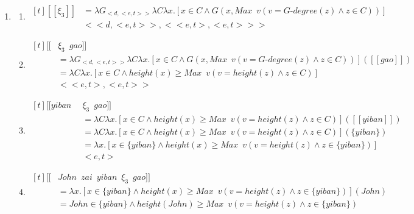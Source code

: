 \documentclass{ctexart}
\begin{document}
\begin{enumerate}
    \item \label{superiority_example_7}
    \begin{enumerate}
        \item \label{superiority_example_7_a}
        $\begin{aligned}[t]
            [\![\xi_3]\!] &= \lambda G_{<d,<e,t>>} \lambda C \lambda x. [x \in C \land G(x,Max \enspace v(v=G \mbox{-} degree(z) \land z \in C))] \\
            & <<d,<e,t>>, <<e,t>,<e,t>>>
        \end{aligned}$

        \item \label{superiority_example_7_b}
        $\begin{aligned}[t]
            [\![&\xi_3 \enspace gao]\!] \\
            &= \lambda G_{<d,<e,t>>} \lambda C \lambda x.[x \in C \land G(x,Max \enspace v(v=G \mbox{-} degree(z) \land z \in C))]([\![gao]\!]) \\
            &= \lambda C \lambda x.[x \in C \land height(x) \geq Max \enspace v(v=height(z) \land z \in C)] \\ 
            &<<e,t>,<e,t>>
        \end{aligned}$

        \item \label{superiority_example_7_c}
        $\begin{aligned}[t]
            [\![yiban \enspace & \xi_3 \enspace gao]\!] \\
            &= \lambda C \lambda x.[x \in C \land height(x) \geq Max \enspace v(v=height(z) \land z \in C)]([\![yiban]\!]) \\
            &= \lambda C \lambda x.[x \in C \land height(x) \geq Max \enspace v(v=height(z) \land z \in C)](\{yiban\}) \\
            &= \lambda x.[x \in \{yiban \} \land height(x) \geq Max \enspace v(v=height(z) \land z \in \{yiban \})] \\
            & <e,t>
        \end{aligned}$

        \item \label{superiority_example_7_d}
        $\begin{aligned}[t]
            [\![&John \enspace zai \enspace yiban \enspace \xi_3 \enspace gao]\!] \\
            &= \lambda x.[x \in \{yiban \} \land height(x) \geq Max \enspace v(v=height(z) \land z \in \{yiban \})](John) \\
            &= John \in \{yiban \} \land height(John) \geq Max \enspace v(v=height(z) \land z \in \{yiban \}) \\
        \end{aligned}$


\end{enumerate}
\end{enumerate}
\end{document}

